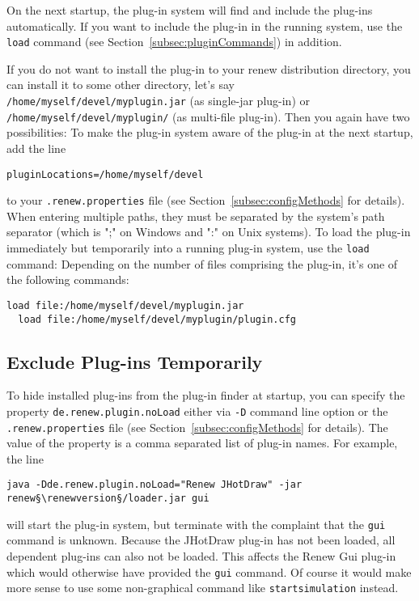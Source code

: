 On the next startup, the plug-in system will find and include the
plug-ins automatically.
If you want to include the plug-in in the running system, use the
\texttt{load} command (see Section~\ref{subsec:pluginCommands})
in addition.

If you do not want to install the plug-in to your renew
distribution directory, you can install it to some other
directory, let's say 
\texttt{/home/myself/devel/myplugin.jar} (as single-jar plug-in)
or \texttt{/home/myself/devel/myplugin/} (as multi-file plug-in).
Then you again have two possibilities:
To make the plug-in system aware of the plug-in at the next
startup, add the line
\begin{lstlisting}[style=xnonfloating]
  pluginLocations=/home/myself/devel
\end{lstlisting}
to your \texttt{.renew.properties} file (see
Section~\ref{subsec:configMethods} for details).
When entering multiple paths, they must be separated by the
system's path separator (which is ";" on Windows and ":" on Unix systems).
To load the plug-in immediately but temporarily into a running
plug-in system, use the \texttt{load} command:
Depending on the number of files comprising the plug-in, it's
one of the following commands:
\begin{lstlisting}[style=xnonfloating]
  load file:/home/myself/devel/myplugin.jar
  load file:/home/myself/devel/myplugin/plugin.cfg
\end{lstlisting}

\subsection{Exclude Plug-ins Temporarily}
\label{subsec:excludePlugins}
To hide installed plug-ins from the plug-in finder at startup, you
can specify the property \texttt{de.renew.plugin.noLoad} either
via \texttt{-D} command line option or the
\texttt{.renew.properties} file (see
Section~\ref{subsec:configMethods} for details).
The value of the property is a comma separated list of plug-in
names.
For example, the line
\begin{lstlisting}[style=xnonfloating]
  java -Dde.renew.plugin.noLoad="Renew JHotDraw" -jar renew§\renewversion§/loader.jar gui
\end{lstlisting}
will start the plug-in system, but terminate with the complaint that the
\texttt{gui} command is unknown.
Because the JHotDraw plug-in has not been loaded, all dependent
plug-ins can also not be loaded.
This affects the Renew Gui plug-in which would otherwise have provided
the \texttt{gui} command.
Of course it would make more sense to use some non-graphical
command like \texttt{startsimulation} instead.

